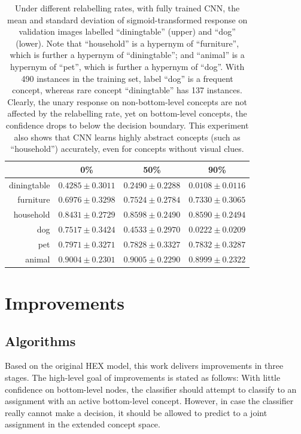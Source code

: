 \documentclass[11pt,a4paper]{article}
\begin{document}
\begin{table}[htbp]
\centering
\begin{tabular}{r|c|c|c}
 & 0\% & 50\% & 90\%\\
\hline
diningtable & $0.4285\pm0.3011$ & $0.2490\pm0.2288$ & $0.0108\pm0.0116$\\
furniture & $0.6976\pm0.3298$ & $0.7524\pm0.2784$ & $0.7330\pm0.3065$\\
household & $0.8431\pm0.2729$ & $0.8598\pm0.2490$ & $0.8590\pm0.2494$\\
\hline
dog & $0.7517\pm0.3424$ & $0.4533\pm0.2970$ & $0.0222\pm0.0209$\\
pet & $0.7971\pm0.3271$ & $0.7828\pm0.3327$ & $0.7832\pm0.3287$\\
animal & $0.9004\pm0.2301$ & $0.9005\pm0.2290$ & $0.8999\pm0.2322$
\end{tabular}
\caption{Under different relabelling rates, with fully trained CNN, the mean and standard deviation of sigmoid-transformed response on validation images labelled ``diningtable'' (upper) and ``dog'' (lower). Note that ``household'' is a hypernym of ``furniture'', which is further a hypernym of ``diningtable''; and ``animal'' is a hypernym of ``pet'', which is further a hypernym of ``dog''. With 490 instances in the training set, label ``dog'' is a frequent concept, whereas rare concept ``diningtable'' has 137 instances. Clearly, the unary response on non-bottom-level concepts are not affected by the relabelling rate, yet on bottom-level concepts, the confidence drops to below the decision boundary.  This experiment also shows that CNN learns highly abstract concepts (such as ``household'') accurately, even for concepts without visual clues.}
\label{tab:response}
\end{table}

\clearpage
\section{Improvements}
\subsection{Algorithms}

Based on the original HEX model, this work delivers improvements in three stages. The high-level goal of improvements is stated as follows: With little confidence on bottom-level nodes, the classifier should attempt to classify to an assignment with an active bottom-level concept. However, in case the classifier really cannot make a decision, it should be allowed to predict to a joint assignment in the extended concept space.
\end{document}
